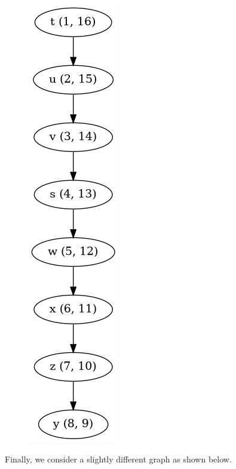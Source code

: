 \begin{figure}[H]
\centering
\includegraphics[scale=0.4]{images/dfs_03.png}
\end{figure}

Finally, we consider a slightly different graph as shown below.

